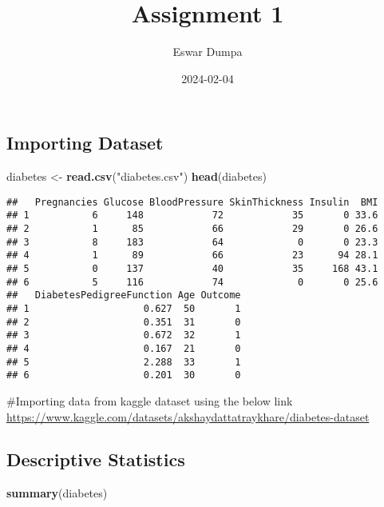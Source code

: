 \documentclass[
]{article}
\title{Assignment 1}
\author{Eswar Dumpa}
\date{2024-02-04}
\newenvironment{Shaded}{\begin{snugshade}}{\end{snugshade}}
\newcommand{\FunctionTok}[1]{\textcolor[rgb]{0.13,0.29,0.53}{\textbf{#1}}}
\newcommand{\NormalTok}[1]{#1}
\newcommand{\OtherTok}[1]{\textcolor[rgb]{0.56,0.35,0.01}{#1}}
\newcommand{\StringTok}[1]{\textcolor[rgb]{0.31,0.60,0.02}{#1}}
\begin{document}
\maketitle

\hypertarget{importing-dataset}{%
\subsection{Importing Dataset}\label{importing-dataset}}

\begin{Shaded}
\begin{Highlighting}[]
\NormalTok{diabetes }\OtherTok{\textless{}{-}} \FunctionTok{read.csv}\NormalTok{(}\StringTok{"diabetes.csv"}\NormalTok{)}
\FunctionTok{head}\NormalTok{(diabetes)}
\end{Highlighting}
\end{Shaded}

\begin{verbatim}
##   Pregnancies Glucose BloodPressure SkinThickness Insulin  BMI
## 1           6     148            72            35       0 33.6
## 2           1      85            66            29       0 26.6
## 3           8     183            64             0       0 23.3
## 4           1      89            66            23      94 28.1
## 5           0     137            40            35     168 43.1
## 6           5     116            74             0       0 25.6
##   DiabetesPedigreeFunction Age Outcome
## 1                    0.627  50       1
## 2                    0.351  31       0
## 3                    0.672  32       1
## 4                    0.167  21       0
## 5                    2.288  33       1
## 6                    0.201  30       0
\end{verbatim}

\#Importing data from kaggle dataset using the below link
\url{https://www.kaggle.com/datasets/akshaydattatraykhare/diabetes-dataset}

\hypertarget{descriptive-statistics}{%
\subsection{Descriptive Statistics}\label{descriptive-statistics}}

\begin{Shaded}
\begin{Highlighting}[]
\FunctionTok{summary}\NormalTok{(diabetes)}
\end{Highlighting}
\end{Shaded}
\end{document}
